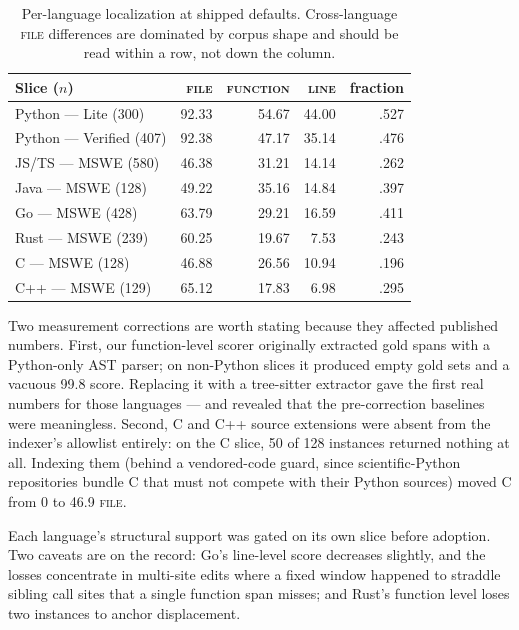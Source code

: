 \documentclass[11pt]{article}
\begin{document}
\begin{table}[h]
\centering
\begin{tabular}{lrrrr}
\toprule
Slice ($n$) & \textsc{file} & \textsc{function} & \textsc{line} & fraction \\
\midrule
Python --- Lite (300)      & 92.33 & 54.67 & 44.00 & .527 \\
Python --- Verified (407)  & 92.38 & 47.17 & 35.14 & .476 \\
JS/TS --- MSWE (580)       & 46.38 & 31.21 & 14.14 & .262 \\
Java --- MSWE (128)        & 49.22 & 35.16 & 14.84 & .397 \\
Go --- MSWE (428)          & 63.79 & 29.21 & 16.59 & .411 \\
Rust --- MSWE (239)        & 60.25 & 19.67 & 7.53  & .243 \\
C --- MSWE (128)           & 46.88 & 26.56 & 10.94 & .196 \\
C++ --- MSWE (129)         & 65.12 & 17.83 & 6.98  & .295 \\
\bottomrule
\end{tabular}
\caption{Per-language localization at shipped defaults. Cross-language
\textsc{file} differences are dominated by corpus shape and should be read
within a row, not down the column.}
\end{table}

Two measurement corrections are worth stating because they affected published
numbers. First, our function-level scorer originally extracted gold spans with
a Python-only AST parser; on non-Python slices it produced empty gold sets and
a vacuous 99.8 score. Replacing it with a tree-sitter extractor gave the first
real numbers for those languages --- and revealed that the pre-correction
baselines were meaningless. Second, C and C++ source extensions were absent
from the indexer's allowlist entirely: on the C slice, 50 of 128 instances
returned nothing at all. Indexing them (behind a vendored-code guard, since
scientific-Python repositories bundle C that must not compete with their
Python sources) moved C from 0 to 46.9 \textsc{file}.

Each language's structural support was gated on its own slice before adoption.
Two caveats are on the record: Go's line-level score decreases slightly, and
the losses concentrate in multi-site edits where a fixed window happened to
straddle sibling call sites that a single function span misses; and Rust's
function level loses two instances to anchor displacement.
\end{document}
